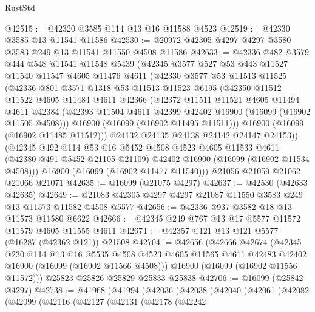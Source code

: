 \begin{lexlean}{RustStd}
\begin{coremodule}
@42515 := @42320 @3585 @114 @13 @16 @11588 @4523
@42519 := @42330 @3585 @13 @11541 @11586
@42530 := @20972 @42305 @4297 @4297 @3580 @3583 @249 @13 @11541 @11550 @4508 @11586
@42633 := @42336
    @482
    @3579
    @444
    @548
    @11541
    @11548
    @5439
    (@42345
      @3577
      @527
      @53
      @443
      @11527
      @11540
      @11547
      @4605
      @11476
      @4611
      (@42330
        @3577
        @53
        @11513
        @11525
        (@42336
          @801
          @3571
          @1318
          @53
          @11513
          @11523
          @6195
          (@42350
            @11512
            @11522
            @4605
            @11484
            @4611
            @42366
            (@42372
              @11511
              @11521
              @4605
              @11494
              @4611
              @42384
              (@42393 @11504 @4611 @42399 @42402 @16900 (@16099 (@16902 @11505 @4508)))
              @16900
              (@16099 (@16902 @11495 @11511)))
            @16900
            (@16099 (@16902 @11485 @11512)))
          @24132
          @24135
          @24138
          @24142
          @24147
          @24153))
      (@42345
        @492
        @114
        @53
        @16
        @5452
        @4508
        @4523
        @4605
        @11533
        @4611
        (@42380 @491 @5452 @21105 @21109)
        @42402
        @16900
        (@16099 (@16902 @11534 @4508)))
      @16900
      (@16099 (@16902 @11477 @11540)))
    @21056
    @21059
    @21062
    @21066
    @21071
@42635 := @16099 (@21075 @4297)
@42637 := @42530 (@42633 @42635)
@42649 := @21083 @42305 @4297 @4297 @21087 @11550 @3583 @249 @13 @11573 @11582 @4508 @5577
@42656 := @42336 @937 @3582 @18 @13 @11573 @11580 @6622
@42666 := @42345 @249 @767 @13 @17 @5577 @11572 @11579 @4605 @11555 @4611
@42674 := @42357 @121 @13 @121 @5577 (@16287 (@42362 @121)) @21508
@42704 := @42656
    (@42666
      @42674
      (@42345
        @230
        @114
        @13
        @16
        @5535
        @4508
        @4523
        @4605
        @11565
        @4611
        @42483
        @42402
        @16900
        (@16099 (@16902 @11566 @4508)))
      @16900
      (@16099 (@16902 @11556 @11572)))
    @25823
    @25826
    @25829
    @25833
    @25838
@42706 := @16099 (@25842 @4297)
@42738 := @41968
    (@41994
      (@42036
        (@42038
          (@42040
            (@42061
              (@42082
                (@42099
                  (@42116
                    (@42127
                      (@42131
                        (@42178
                          (@42242

\end{coremodule}
\end{lexlean}
